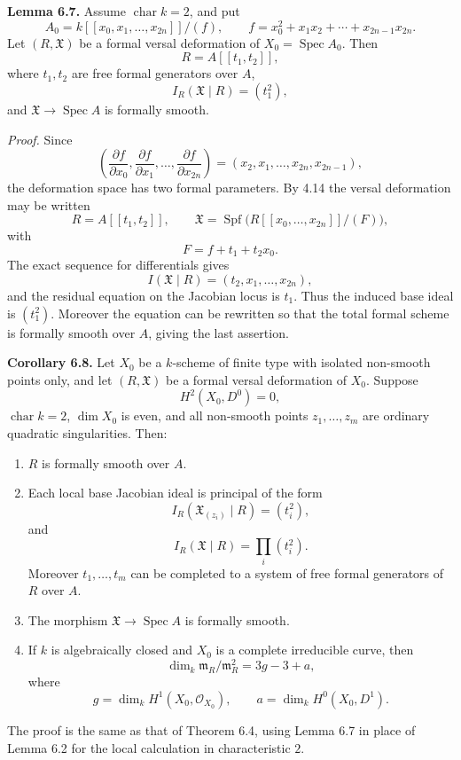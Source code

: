 \documentclass[11pt]{article}
\providecommand{\Spec}{\operatorname{Spec}}
\providecommand{\Spf}{\operatorname{Spf}}
\providecommand{\Oo}{\mathcal O}
\begin{document}
\textbf{Lemma 6.7.}  Assume \(\operatorname{char}k=2\), and put
\[
        A_0=
        k[[x_0,x_1,\ldots,x_{2n}]]/(f),
        \qquad
        f=x_0^2+x_1x_2+\cdots+x_{2n-1}x_{2n}.
\]
Let \((R,\mathfrak X)\) be a formal versal deformation of \(X_0=\Spec A_0\).  Then
\[
        R=A[[t_1,t_2]],
\]
where \(t_1,t_2\) are free formal generators over \(A\),
\[
        I_R(\mathfrak X\mid R)=(t_1^2),
\]
and \(\mathfrak X\to\Spec A\) is formally smooth.

\emph{Proof.}  Since
\[
        \left(\frac{\partial f}{\partial x_0},
        \frac{\partial f}{\partial x_1},\ldots,
        \frac{\partial f}{\partial x_{2n}}\right)
        =
        (x_2,x_1,\ldots,x_{2n},x_{2n-1}),
\]
the deformation space has two formal parameters.  By 4.14 the versal deformation may be written
\[
        R=A[[t_1,t_2]],\qquad
        \mathfrak X=
        \Spf\bigl(R[[x_0,\ldots,x_{2n}]]/(F)\bigr),
\]
with
\[
        F=f+t_1+t_2x_0.
\]
The exact sequence for differentials gives
\[
        I(\mathfrak X\mid R)=(t_2,x_1,\ldots,x_{2n}),
\]
and the residual equation on the Jacobian locus is \(t_1\).  Thus the induced base ideal is \((t_1^2)\).  Moreover the equation can be rewritten so that the total formal scheme is formally smooth over \(A\), giving the last assertion.

\textbf{Corollary 6.8.}  Let \(X_0\) be a \(k\)-scheme of finite type with isolated non-smooth points only, and let \((R,\mathfrak X)\) be a formal versal deformation of \(X_0\).  Suppose
\[
        H^2(X_0,D^0)=0,
\]
\(\operatorname{char}k=2\), \(\dim X_0\) is even, and all non-smooth points \(z_1,\ldots,z_m\) are ordinary quadratic singularities.  Then:
\begin{enumerate}[label=(\arabic*)]
\item \(R\) is formally smooth over \(A\).
\item Each local base Jacobian ideal is principal of the form
\[
        I_R(\mathfrak X_{(z_i)}\mid R)=(t_i^2),
\]
and
\[
        I_R(\mathfrak X\mid R)=\prod_i (t_i^2).
\]
Moreover \(t_1,\ldots,t_m\) can be completed to a system of free formal generators of \(R\) over \(A\).
\item The morphism \(\mathfrak X\to\Spec A\) is formally smooth.
\item If \(k\) is algebraically closed and \(X_0\) is a complete irreducible curve, then
\[
        \dim_k\mathfrak m_R/\mathfrak m_R^2=3g-3+a,
\]
where
\[
        g=\dim_kH^1(X_0,\Oo_{X_0}),
        \qquad
        a=\dim_kH^0(X_0,D^1).
\]
\end{enumerate}

The proof is the same as that of Theorem 6.4, using Lemma 6.7 in place of Lemma 6.2 for the local calculation in characteristic \(2\).
\end{document}
